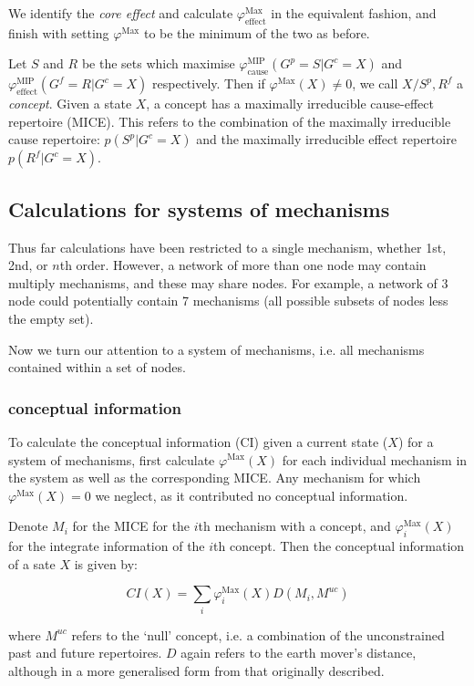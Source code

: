 We identify the \textit{core effect} and calculate $\varphi^{\text{Max}}_{\text{effect}}$ in the equivalent fashion, and finish with setting $\varphi^{\text{Max}}$ to be the minimum of the two as before.

Let $S$ and $R$ be the sets which maximise $\varphi^{\text{MIP}}_{\text{cause}}(G^p = S|G^c = X)$ and $\varphi^{\text{MIP}}_{\text{effect}}(G^f = R|G^c = X)$ respectively. Then if $\varphi^{\text{Max}}(X)\neq 0$, we call $X/S^p,R^f$ a \textit{concept}. Given a state $X$, a concept has a maximally irreducible cause-effect repertoire (MICE). This refers to the combination of the maximally irreducible cause repertoire: $p(S^p|G^c=X)$ and the maximally irreducible effect repertoire $p(R^f|G^c=X)$.

\subsection{Calculations for systems of mechanisms}
Thus far calculations have been restricted to a single mechanism, whether 1st, 2nd, or $n$th order. However, a network of more than one node may contain multiply mechanisms, and these may share nodes. For example, a network of 3 node could potentially contain 7 mechanisms (all possible subsets of nodes less the empty set).

Now we turn our attention to a system of mechanisms, i.e. all mechanisms contained within a set of nodes. 

\subsubsection{conceptual information}
To calculate the conceptual information (CI) given a current state ($X$) for a system of mechanisms, first calculate $\varphi^{\text{Max}}(X)$ for each individual mechanism in the system as well as the corresponding MICE. Any mechanism for which $\varphi^{\text{Max}}(X)=0$ we neglect, as it contributed no conceptual information.

Denote $M_i$ for the MICE for the $i$th mechanism with a concept, and $\varphi^{\text{Max}}_i(X)$ for the integrate information of the $i$th concept. Then the conceptual information of a sate $X$ is given by:

\begin{equation}
\label{def:CI}
CI(X) = \sum \limits_i \varphi^{\text{Max}}_i(X) D(M_i, M^{uc})
\end{equation}

where $M^{uc}$ refers to the `null' concept, i.e. a combination of the unconstrained past and future repertoires. $D$ again refers to the earth mover's distance, although in a more generalised form from that originally 
described. 

